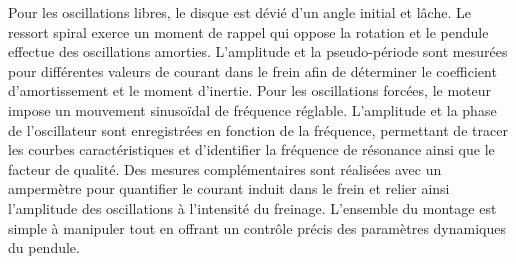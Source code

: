 \newline
Pour les oscillations libres, le disque est dévié d’un angle initial et lâche. Le ressort spiral exerce un moment de rappel qui oppose la rotation et le pendule effectue des oscillations amorties. L’amplitude et la pseudo-période sont mesurées pour différentes valeurs de courant dans le frein afin de déterminer le coefficient d’amortissement et le moment d’inertie. 
\newline
Pour les oscillations forcées, le moteur impose un mouvement sinusoïdal de fréquence réglable. L’amplitude et la phase de l’oscillateur sont enregistrées en fonction de la fréquence, permettant de tracer les courbes caractéristiques et d’identifier la fréquence de résonance ainsi que le facteur de qualité.
\newline
Des mesures complémentaires sont réalisées avec un ampermètre pour quantifier le courant induit dans le frein et relier ainsi l’amplitude des oscillations à l’intensité du freinage. L’ensemble du montage est simple à manipuler tout en offrant un contrôle précis des paramètres dynamiques du pendule.


